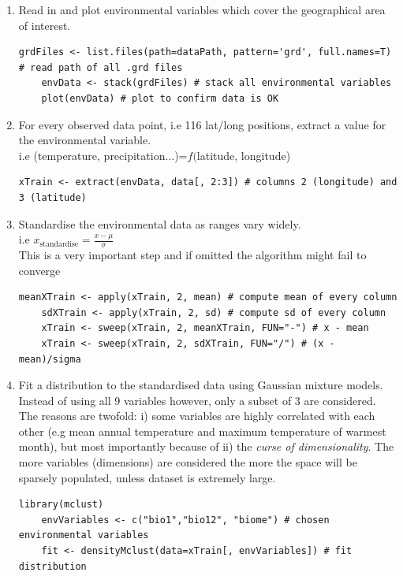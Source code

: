 \documentclass[a4paper,11pt]{article}
\begin{document}
\clearpage

\begin{enumerate}
	\item Read in and plot environmental variables which cover the geographical area of interest.
	\vspace{0.3cm}
	\begin{lstlisting}[style=RCode]
	grdFiles <- list.files(path=dataPath, pattern='grd', full.names=T) # read path of all .grd files
	envData <- stack(grdFiles) # stack all environmental variables
	plot(envData) # plot to confirm data is OK
	\end{lstlisting}
	\vspace{-0.6cm}

	\item For every observed data point, i.e 116 lat/long positions, extract a value for the environmental variable.\\
	i.e (temperature, precipitation$\ldots$)=$f($latitude, longitude)
	\vspace{0.3cm}
	\begin{lstlisting}[style=RCode]
	xTrain <- extract(envData, data[, 2:3]) # columns 2 (longitude) and 3 (latitude)
	\end{lstlisting}
	\vspace{-0.6cm}

	\item Standardise the environmental data as ranges vary widely.\\ 
	i.e $x_{\mathrm{standardise}} = \frac{x-\mu}{\sigma}$\\
	This is a very important step and if omitted the algorithm might fail to converge
	\vspace{0.3cm}
	\begin{lstlisting}[style=RCode]
	meanXTrain <- apply(xTrain, 2, mean) # compute mean of every column
	sdXTrain <- apply(xTrain, 2, sd) # compute sd of every column
	xTrain <- sweep(xTrain, 2, meanXTrain, FUN="-") # x - mean
	xTrain <- sweep(xTrain, 2, sdXTrain, FUN="/") # (x - mean)/sigma
	\end{lstlisting}
	\vspace{-0.6cm}

	\item Fit a distribution to the standardised data using Gaussian mixture models. Instead of using all 9 variables
	however, only a subset of 3 are considered. The reasons are twofold: i) some variables are highly correlated with each other
	(e.g mean annual temperature and maximum temperature of warmest month), but most importantly because of ii) the \textit{curse of dimensionality}.
	The more variables (dimensions) are considered the more the space will be sparsely populated, unless dataset is extremely large. 
	\vspace{0.3cm}
	\begin{lstlisting}[style=RCode]
	library(mclust)
	envVariables <- c("bio1","bio12", "biome") # chosen environmental variables
	fit <- densityMclust(data=xTrain[, envVariables]) # fit distribution
	\end{lstlisting}
	\vspace{-0.6cm}


\end{enumerate}
\end{document}
